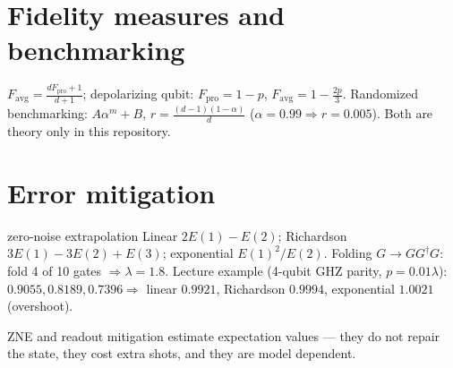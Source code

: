 \documentclass[11pt,a4paper,openany]{book}
\begin{document}
\section{Fidelity measures and benchmarking}
$F_{\text{avg}} = \frac{dF_{\text{pro}} + 1}{d + 1}$; depolarizing qubit: $F_{\text{pro}} = 1 - p$, $F_{\text{avg}} = 1 - \frac{2p}{3}$. Randomized benchmarking:
$A\alpha^m + B$, $r = \frac{(d-1)(1-\alpha)}{d}$ ($\alpha = 0.99 \Rightarrow r = 0.005$). Both are theory only in this repository.

\section{Error mitigation}
\begin{keyres}{zero-noise extrapolation}
Linear $2E(1) - E(2)$; Richardson $3E(1) - 3E(2) + E(3)$; exponential $E(1)^2/E(2)$. Folding $G \to GG^\dagger G$: fold 4 of 10 gates $\Rightarrow\lambda = 1.8$.
Lecture example (4-qubit GHZ parity, $p = 0.01\lambda$): $0.9055, 0.8189, 0.7396 \Rightarrow$ linear $0.9921$, Richardson $0.9994$, exponential $1.0021$ (overshoot).
\end{keyres}
\begin{trap}
ZNE and readout mitigation estimate expectation values --- they do not repair the state, they cost extra shots, and they are model dependent.
\end{trap}

\end{document}
